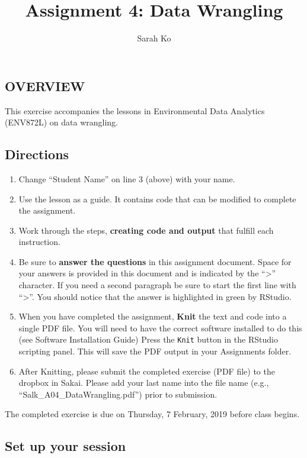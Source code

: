 \documentclass[]{article}
\title{Assignment 4: Data Wrangling}
\author{Sarah Ko}
\date{}
\providecommand{\tightlist}{%
  \setlength{\itemsep}{0pt}\setlength{\parskip}{0pt}}
\begin{document}
\maketitle

\subsection{OVERVIEW}\label{overview}

This exercise accompanies the lessons in Environmental Data Analytics
(ENV872L) on data wrangling.

\subsection{Directions}\label{directions}

\begin{enumerate}
\def\labelenumi{\arabic{enumi}.}
\tightlist
\item
  Change ``Student Name'' on line 3 (above) with your name.
\item
  Use the lesson as a guide. It contains code that can be modified to
  complete the assignment.
\item
  Work through the steps, \textbf{creating code and output} that fulfill
  each instruction.
\item
  Be sure to \textbf{answer the questions} in this assignment document.
  Space for your answers is provided in this document and is indicated
  by the ``\textgreater{}'' character. If you need a second paragraph be
  sure to start the first line with ``\textgreater{}''. You should
  notice that the answer is highlighted in green by RStudio.
\item
  When you have completed the assignment, \textbf{Knit} the text and
  code into a single PDF file. You will need to have the correct
  software installed to do this (see Software Installation Guide) Press
  the \texttt{Knit} button in the RStudio scripting panel. This will
  save the PDF output in your Assignments folder.
\item
  After Knitting, please submit the completed exercise (PDF file) to the
  dropbox in Sakai. Please add your last name into the file name (e.g.,
  ``Salk\_A04\_DataWrangling.pdf'') prior to submission.
\end{enumerate}

The completed exercise is due on Thursday, 7 February, 2019 before class
begins.

\subsection{Set up your session}\label{set-up-your-session}
\end{document}
